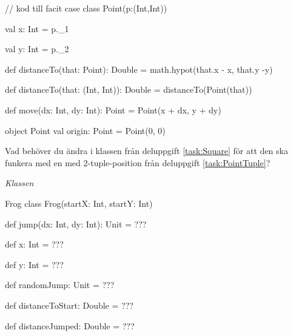 \begin{CodeSmall}
// kod till facit
case class Point(p:(Int,Int)) {
  val x: Int = p._1
  
  val y: Int = p._2
  
  def distanceTo(that: Point): Double = 
    math.hypot(that.x - x, that.y -y)
  
  def distanceTo(that: (Int, Int)): Double = 
    distanceTo(Point(that)) 
  
  def move(dx: Int, dy: Int): Point = Point(x + dx, y + dy)
}

object Point {
  val origin: Point = Point(0, 0)
}
\end{CodeSmall}

\Task\Pen Vad behöver du ändra i klassen  från deluppgift \ref{task:Square} för att den ska funkera med en  med 2-tuple-position från deluppgift \ref{task:PointTuple}?




\ExtraTasks %

\Task \emph{Klassen } 

\Subtask 

\begin{ScalaSpec}{Frog}
class Frog(startX: Int, startY: Int) {

  def jump(dx: Int, dy: Int): Unit = ???

  def x: Int = ??? 
  
  def y: Int = ???
 
  def randomJump: Unit = ???
  
  def distanceToStart: Double = ???
  
  def distanceJumped: Double = ???
}

\end{ScalaSpec}

\AdvancedTasks %

\Task     
    